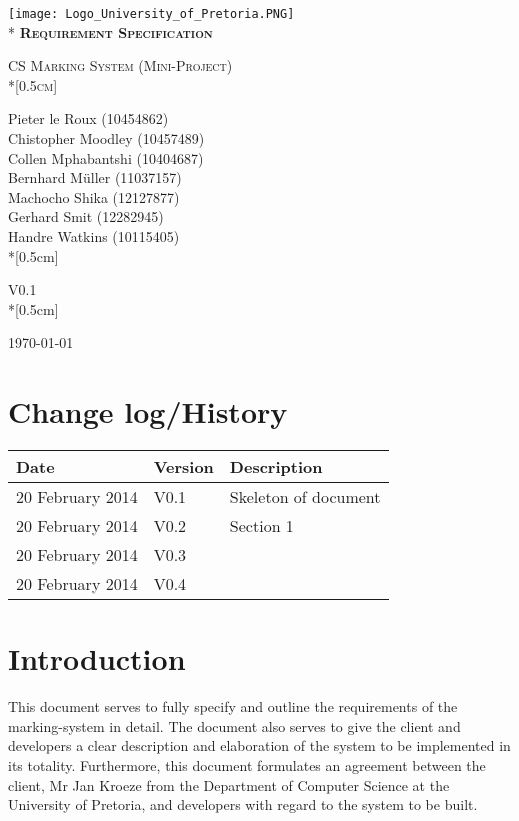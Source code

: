 \documentclass[12pt, a4paper]{scrartcl}
\begin{document}
         
	\begin{titlepage}
		\begin{center}
		\texttt{[image: Logo\_University\_of\_Pretoria.PNG]}\\*
		\vspace{3.0cm}
		\textsc{\LARGE \bf{Requirement Specification}}

		\textsc{\Large CS Marking System (Mini-Project)\\*[0.5cm]}

			Pieter le Roux (10454862)\\
			Chistopher Moodley (10457489)\\
			Collen Mphabantshi (10404687)\\
			Bernhard M\"uller (11037157)\\
			Machocho Shika (12127877)\\
			Gerhard Smit (12282945)\\
			Handre Watkins (10115405)\\*[0.5cm]

			V0.1\\*[0.5cm]

			{\large \today}

		\end{center}
	\end{titlepage}


		\thispagestyle{empty}
		\section*{Change log/History}
		\begin{tabular}{| l | l | l |}
			\hline
			Date & Version & Description \\
			\hline
			20 February 2014 & V0.1 & Skeleton of document \\
			\hline
			20 February 2014 & V0.2 & Section 1 \\
			\hline
			20 February 2014 & V0.3 &  \\
			\hline
			20 February 2014 & V0.4 &  \\
			\hline
		\end{tabular}
		\newpage

		\thispagestyle{empty}
		\tableofcontents
		\newpage

		\setcounter{page}{1}
		\pagestyle{plain}
		\section{Introduction}
			This document serves to fully specify and 		outline the requirements of the marking-system in detail. The document also serves to give the client and developers a clear description and elaboration of the system to be implemented in its totality. Furthermore, this document formulates an agreement between the client, Mr Jan Kroeze from the Department of Computer Science at the University of Pretoria, and developers with regard to the system to be built.
\end{document}
